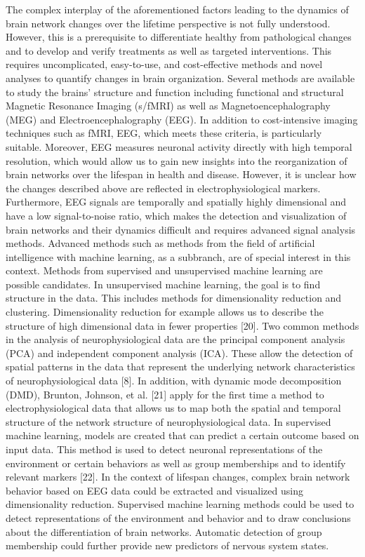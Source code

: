 The complex interplay of the aforementioned factors leading to the dynamics of brain network changes over the lifetime perspective is not fully understood. However, this is a prerequisite to differentiate healthy from pathological changes and to develop and verify treatments as well as targeted interventions. This requires uncomplicated, easy-to-use, and cost-effective methods and novel analyses to quantify changes in brain organization. Several methods are available to study the brains' structure and function including functional and structural Magnetic Resonance Imaging (s/fMRI) as well as Magnetoencephalography (MEG) and Electroencephalography (EEG). In addition to cost-intensive imaging techniques such as fMRI, EEG, which meets these criteria, is particularly suitable.
Moreover, EEG measures neuronal activity directly with high temporal resolution, which would allow us to gain new insights into the reorganization of brain networks over the lifespan in health and disease. However, it is unclear how the changes described above are reflected in electrophysiological markers. Furthermore, EEG signals are temporally and spatially highly dimensional and have a low signal-to-noise ratio, which makes the detection and visualization of brain networks and their dynamics difficult and requires advanced signal analysis methods. 
Advanced methods such as methods from the field of artificial intelligence with machine learning, as a subbranch, are of special interest in this context. Methods from supervised and unsupervised machine learning are possible candidates. In unsupervised machine learning, the goal is to find structure in the data. This includes methods for dimensionality reduction and clustering. Dimensionality reduction for example allows us to describe the structure of high dimensional data in fewer properties [20]. Two common methods in the analysis of neurophysiological data are the principal component analysis (PCA) and independent component analysis (ICA). These allow the detection of spatial patterns in the data that represent the underlying network characteristics of neurophysiological data [8]. In addition, with dynamic mode decomposition (DMD), Brunton, Johnson, et al. [21] apply for the first time a method to electrophysiological data that allows us to map both the spatial and temporal structure of the network structure of neurophysiological data.
In supervised machine learning, models are created that can predict a certain outcome based on input data. This method is used to detect neuronal representations of the environment or certain behaviors as well as group memberships and to identify relevant markers [22].
In the context of lifespan changes, complex brain network behavior based on EEG data could be extracted and visualized using dimensionality reduction. Supervised machine learning methods could be used to detect representations of the environment and behavior and to draw conclusions about the differentiation of brain networks. Automatic detection of group membership could further provide new predictors of nervous system states.
